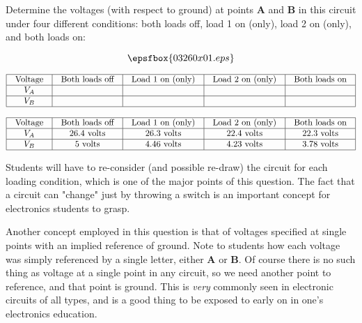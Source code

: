 

Determine the voltages (with respect to ground) at points {\bf A} and {\bf B} in this circuit under four different conditions: both loads off, load 1 on (only), load 2 on (only), and both loads on:

$$\epsfbox{03260x01.eps}$$


$$\vbox{\offinterlineskip
\halign{\strut
\vrule \quad\hfil # \ \hfil & 
\vrule \quad\hfil # \ \hfil & 
\vrule \quad\hfil # \ \hfil & 
\vrule \quad\hfil # \ \hfil & 
\vrule \quad\hfil # \ \hfil \vrule \cr
\noalign{\hrule}
%
Voltage & Both loads off & Load 1 on (only) & Load 2 on (only) & Both loads on \cr
%
\noalign{\hrule}
%
$V_A$ &  &  &  &  \cr
%
\noalign{\hrule}
%
$V_B$ &  &  &  &  \cr
%
\noalign{\hrule}
} %
}$$ %







$$\vbox{\offinterlineskip
\halign{\strut
\vrule \quad\hfil # \ \hfil & 
\vrule \quad\hfil # \ \hfil & 
\vrule \quad\hfil # \ \hfil & 
\vrule \quad\hfil # \ \hfil & 
\vrule \quad\hfil # \ \hfil \vrule \cr
\noalign{\hrule}
%
Voltage & Both loads off & Load 1 on (only) & Load 2 on (only) & Both loads on \cr
%
\noalign{\hrule}
%
$V_A$ & 26.4 volts & 26.3 volts & 22.4 volts & 22.3 volts \cr
%
\noalign{\hrule}
%
$V_B$ & 5 volts & 4.46 volts & 4.23 volts & 3.78 volts \cr
%
\noalign{\hrule}
} %
}$$ %







Students will have to re-consider (and possible re-draw) the circuit for each loading condition, which is one of the major points of this question.  The fact that a circuit can "change" just by throwing a switch is an important concept for electronics students to grasp.  

Another concept employed in this question is that of voltages specified at single points with an implied reference of ground.  Note to students how each voltage was simply referenced by a single letter, either {\bf A} or {\bf B}.  Of course there is no such thing as voltage at a single point in any circuit, so we need another point to reference, and that point is ground.  This is {\it very} commonly seen in electronic circuits of all types, and is a good thing to be exposed to early on in one's electronics education.

